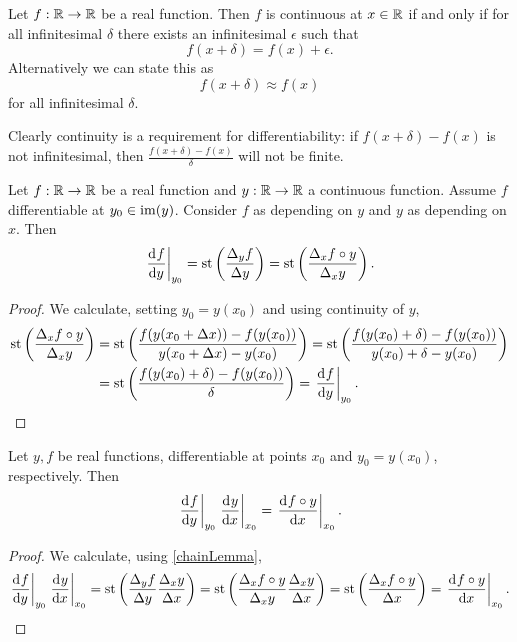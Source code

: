 \begin{proposition}
Let $f:\mathbb{R}\to\mathbb{R}$ be a real function. Then $f$ is continuous at $x\in\mathbb{R}$ \textup{if and only if} for all infinitesimal $\delta$ there exists an infinitesimal $\epsilon$ such that
\[ f(x+\delta) = f(x) + \epsilon. \]
Alternatively we can state this as
\[ f(x+\delta) \approx f(x) \]
for all infinitesimal $\delta$.
\end{proposition}

Clearly continuity is a requirement for differentiability: if $f(x+\delta) - f(x)$ is not infinitesimal, then $\frac{f(x+\delta) - f(x)}{\delta}$ will not be finite.

\begin{lemma} \label{chainLemma}
Let $f:\mathbb{R}\to\mathbb{R}$ be a real function and $y:\mathbb{R}\to\mathbb{R}$ a continuous function. Assume $f$ differentiable at $y_0\in\operatorname{im}(y)$. Consider $f$ as depending on $y$ and $y$ as depending on $x$. Then
\[ \left.\mathinner{ \dfrac{\operatorname{d \!}{^{}}f}{\operatorname{d \!}{{y}^{}}} }\right|_{y_0} = \operatorname{st}\left(\frac{\Delta_y f}{\Delta y}\right) = \operatorname{st}\left(\frac{\Delta_x f\circ y}{\Delta_x y}\right). \]
\end{lemma}
\begin{proof}
We calculate, setting $y_0 = y(x_0)$ and using continuity of $y$,
\begin{align*}
\operatorname{st}\left(\frac{\Delta_x f\circ y}{\Delta_x y}\right) &= \operatorname{st}\left(\frac{f(y(x_0+\Delta x)) -f(y(x_0))}{y(x_0+\Delta x) - y(x_0)}\right) = \operatorname{st}\left(\frac{f(y(x_0)+\delta) -f(y(x_0))}{y(x_0)+\delta - y(x_0)}\right) \\
&= \operatorname{st}\left(\frac{f(y(x_0)+\delta) -f(y(x_0))}{\delta}\right) = \left.\mathinner{ \dfrac{\operatorname{d \!}{^{}}f}{\operatorname{d \!}{{y}^{}}} }\right|_{y_0}.
\end{align*}
\end{proof}

\begin{proposition}
Let $y,f$ be real functions, differentiable at points $x_0$ and $y_0=y(x_0)$, respectively. Then
\[ \left.\mathinner{ \dfrac{\operatorname{d \!}{^{}}f}{\operatorname{d \!}{{y}^{}}} }\right|_{y_0} \left.\mathinner{ \dfrac{\operatorname{d \!}{^{}}y}{\operatorname{d \!}{{x}^{}}} }\right|_{x_0} = \left.\mathinner{ \dfrac{\operatorname{d \!}{^{}}f\circ y}{\operatorname{d \!}{{x}^{}}} }\right|_{x_0}. \]
\end{proposition}
\begin{proof}
We calculate, using \ref{chainLemma},
\[ \left.\mathinner{ \dfrac{\operatorname{d \!}{^{}}f}{\operatorname{d \!}{{y}^{}}} }\right|_{y_0} \left.\mathinner{ \dfrac{\operatorname{d \!}{^{}}y}{\operatorname{d \!}{{x}^{}}} }\right|_{x_0} = \operatorname{st}\left(\frac{\Delta_y f}{\Delta y}\frac{\Delta_x y}{\Delta x}\right) = \operatorname{st}\left(\frac{\Delta_x f\circ y}{\Delta_x y}\frac{\Delta_x y}{\Delta x}\right) = \operatorname{st}\left(\frac{\Delta_x f\circ y}{\Delta x}\right) = \left.\mathinner{ \dfrac{\operatorname{d \!}{^{}}f\circ y}{\operatorname{d \!}{{x}^{}}} }\right|_{x_0}. \]
\end{proof}


